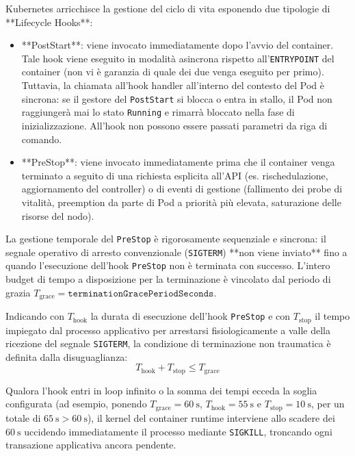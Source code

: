 \documentclass[11pt, a4paper]{article}
\begin{document}
Kubernetes arricchisce la gestione del ciclo di vita esponendo due tipologie di **Lifecycle Hooks**:
\begin{itemize}
    \item **PostStart**: viene invocato immediatamente dopo l'avvio del container. Tale hook viene eseguito in modalità asincrona rispetto all'\texttt{ENTRYPOINT} del container (non vi è garanzia di quale dei due venga eseguito per primo). Tuttavia, la chiamata all'hook handler all'interno del contesto del Pod è sincrona: se il gestore del \texttt{PostStart} si blocca o entra in stallo, il Pod non raggiungerà mai lo stato \texttt{Running} e rimarrà bloccato nella fase di inizializzazione. All'hook non possono essere passati parametri da riga di comando.
    \item **PreStop**: viene invocato immediatamente prima che il container venga terminato a seguito di una richiesta esplicita all'API (es. rischedulazione, aggiornamento del controller) o di eventi di gestione (fallimento dei probe di vitalità, preemption da parte di Pod a priorità più elevata, saturazione delle risorse del nodo).
\end{itemize}

La gestione temporale del \texttt{PreStop} è rigorosamente sequenziale e sincrona: il segnale operativo di arresto convenzionale (\texttt{SIGTERM}) **non viene inviato** fino a quando l'esecuzione dell'hook \texttt{PreStop} non è terminata con successo. L'intero budget di tempo a disposizione per la terminazione è vincolato dal periodo di grazia $T_{\text{grace}} = \texttt{terminationGracePeriodSeconds}$.

Indicando con $T_{\text{hook}}$ la durata di esecuzione dell'hook \texttt{PreStop} e con $T_{\text{stop}}$ il tempo impiegato dal processo applicativo per arrestarsi fisiologicamente a valle della ricezione del segnale \texttt{SIGTERM}, la condizione di terminazione non traumatica è definita dalla disuguaglianza:
\[
\boxed{T_{\text{hook}} + T_{\text{stop}} \le T_{\text{grace}}}
\]

Qualora l'hook entri in loop infinito o la somma dei tempi ecceda la soglia configurata (ad esempio, ponendo $T_{\text{grace}} = \SI{60}{\second}$, $T_{\text{hook}} = \SI{55}{\second}$ e $T_{\text{stop}} = \SI{10}{\second}$, per un totale di $\SI{65}{\second} > \SI{60}{\second}$), il kernel del container runtime interviene allo scadere dei $\SI{60}{\second}$ uccidendo immediatamente il processo mediante \texttt{SIGKILL}, troncando ogni transazione applicativa ancora pendente.
\end{document}
